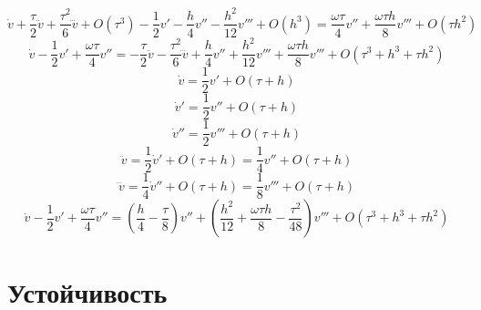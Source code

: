 \begin{enumerate}
\[
\dot v + \frac{\tau}{2} \ddot v  + \frac{\tau^2}{6} \dddot v + O\left(\tau^3\right) 
- \frac{1}{2} v' -  \frac{h}{4}v'' - \frac{h^2}{12} v''' + O\left(h^3\right) = 
 \frac{\omega \tau}{4} v'' +  \frac{\omega \tau h}{8} v''' + O\left(\tau h^2\right) 
\]
\[
\dot v - \frac{1}{2} v' +  \frac{\omega \tau}{4} v'' =
- \frac{\tau}{2} \ddot v  - \frac{\tau^2}{6} \dddot v 
 +  \frac{h}{4}v'' + \frac{h^2}{12} v''' 
 +  \frac{\omega \tau h}{8} v''' + 
 O\left(\tau^3 +h^3 + \tau h^2\right)
\]
\[
\dot v = \frac{1}{2} v' + O\left( \tau + h \right)
\]
\[
\dot v' = \frac{1}{2} v'' + O\left( \tau + h \right)
\]
\[
\dot v'' = \frac{1}{2} v''' + O\left( \tau + h \right)
\]
\[
\ddot v = \frac{1}{2} \dot v' + O\left( \tau + h \right) = 
\frac{1}{4} v'' + O\left( \tau + h \right)
\]
\[
\dddot v = \frac{1}{4} \dot v'' + O\left( \tau + h \right) = 
\frac{1}{8} v''' + O\left( \tau + h \right)
\]
\[
\dot v - \frac{1}{2} v' +  \frac{\omega \tau}{4} v'' =
 \left(\frac{h}{4}
- \frac{\tau}{8} \right) v''  
  + \left(\frac{h^2}{12} 
 +  \frac{\omega \tau h}{8} - \frac{\tau^2}{48} \right) v'''  + 
 O\left(\tau^3 +h^3 + \tau h^2\right)
\]
\end{enumerate}

\section{Устойчивость}

